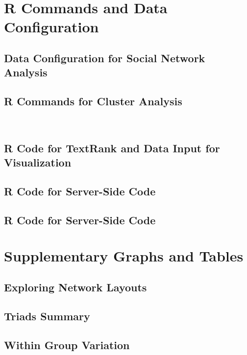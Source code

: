 \documentclass[11pt]{article}
\begin{document}



\section{R Commands and Data Configuration} \label{App:AppendixA}
\subsection{Data Configuration for Social Network Analysis}

\subsection{R Commands for Cluster Analysis}
\
\subsection{R Code for TextRank and Data Input for Visualization}

\subsection{R Code for Server-Side Code}

\subsection{R Code for Server-Side Code}

\clearpage

\section{Supplementary Graphs and Tables} \label{App:AppendixB}
\subsection{Exploring Network Layouts}

\subsection{Triads Summary}

\subsection{Within Group Variation}

\end{document}
